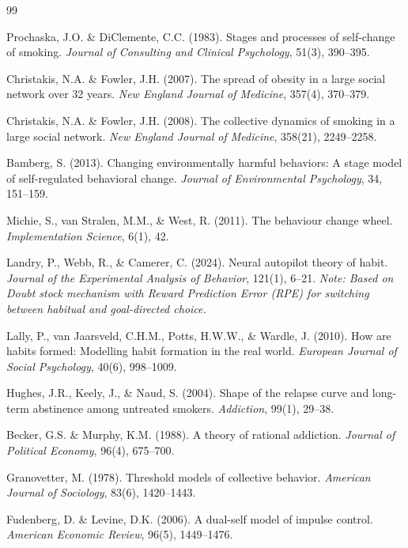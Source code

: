 \begin{thebibliography}{99}

 Prochaska, J.O. \& DiClemente, C.C. (1983). Stages and processes of self-change of smoking. \textit{Journal of Consulting and Clinical Psychology}, 51(3), 390--395.

 Christakis, N.A. \& Fowler, J.H. (2007). The spread of obesity in a large social network over 32 years. \textit{New England Journal of Medicine}, 357(4), 370--379.

 Christakis, N.A. \& Fowler, J.H. (2008). The collective dynamics of smoking in a large social network. \textit{New England Journal of Medicine}, 358(21), 2249--2258.

 Bamberg, S. (2013). Changing environmentally harmful behaviors: A stage model of self-regulated behavioral change. \textit{Journal of Environmental Psychology}, 34, 151--159.

 Michie, S., van Stralen, M.M., \& West, R. (2011). The behaviour change wheel. \textit{Implementation Science}, 6(1), 42.

 Landry, P., Webb, R., \& Camerer, C. (2024). Neural autopilot theory of habit. \textit{Journal of the Experimental Analysis of Behavior}, 121(1), 6--21. \textit{Note: Based on Doubt stock mechanism with Reward Prediction Error (RPE) for switching between habitual and goal-directed choice.}

 Lally, P., van Jaarsveld, C.H.M., Potts, H.W.W., \& Wardle, J. (2010). How are habits formed: Modelling habit formation in the real world. \textit{European Journal of Social Psychology}, 40(6), 998--1009.

 Hughes, J.R., Keely, J., \& Naud, S. (2004). Shape of the relapse curve and long-term abstinence among untreated smokers. \textit{Addiction}, 99(1), 29--38.

 Becker, G.S. \& Murphy, K.M. (1988). A theory of rational addiction. \textit{Journal of Political Economy}, 96(4), 675--700.

 Granovetter, M. (1978). Threshold models of collective behavior. \textit{American Journal of Sociology}, 83(6), 1420--1443.

 Fudenberg, D. \& Levine, D.K. (2006). A dual-self model of impulse control. \textit{American Economic Review}, 96(5), 1449--1476.


\end{thebibliography}
